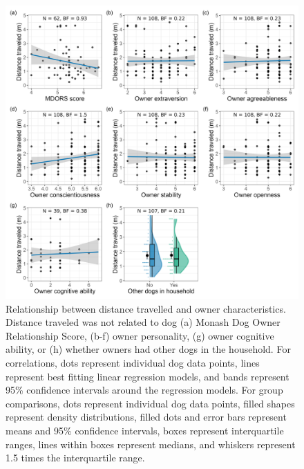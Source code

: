 \documentclass[
  doc]{apa6}
\begin{document}
\begin{figure}

{\centering \includegraphics[width=0.95\linewidth]{figures/owner_characteristics} 

}

\caption{Relationship between distance travelled and owner characteristics. Distance traveled was not related to dog (a) Monash Dog Owner Relationship Score, (b-f) owner personality, (g) owner cognitive ability, or (h) whether owners had other dogs in the household. For correlations, dots represent individual dog data points, lines represent best fitting linear regression models, and bands represent 95\% confidence intervals around the regression models. For group comparisons, dots represent individual dog data points, filled shapes represent density distributions, filled dots and error bars represent means and 95\% confidence intervals, boxes represent interquartile ranges, lines within boxes represent medians, and whiskers represent 1.5 times the interquartile range. }\label{fig:owner-char}
\end{figure}
\end{document}
